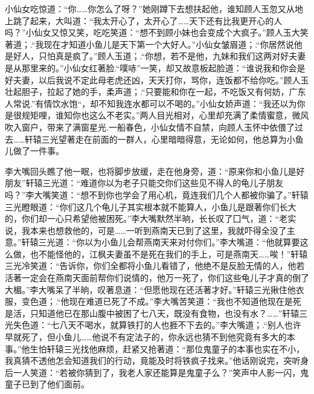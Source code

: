 \documentclass[12pt,oneside]{book}
\begin{document}
小仙女吃惊道：``你\ldots\ldots 你怎么了呀？''她刚蹲下去想扶起他，谁知顾人玉忽又从地上跳了起来，大叫道：``我太开心了，太开心了\ldots\ldots 天下还有比我更开心的人吗？''小仙女又惊又笑，吃吃笑道：``想不到顾小妹也会变成个大疯子。''顾人玉大笑著道；.``我现在才知道小鱼儿是天下第一个大好人。''小仙女皱眉道；.``你居然说他是好人，只怕真是疯了。''顾人玉道；.``你想，若不是他，九妹和我们这两对好夫妻是从那里来的。''小仙女红著脸.``噗哧''一笑，却又故意板起脸道：``谁说我和你会是好夫妻，以后我说不定此母老虎还凶，天天打你，骂你，连饭都不给你吃。''顾人玉壮起胆子，拉起了她的手，柔声道；.``只要能和你在一起，不吃饭又有何妨，广东人常说.''有情饮水饱``，却不知我连水都可以不喝的。''小仙女娇声道：``我还以为你是很规矩哩，谁知你也这么不老实。''两人目光相对，心里却充满了柔情蜜意，微风吹入窗户，带来了满窗星光.一船春色，小仙女情不自禁，向顾人玉怀中依偎了过去\ldots\ldots 轩辕三光望著走在前面的一群人，心里暗暗得意，无论如何，他总算为小鱼儿做了一件事。

李大嘴回头瞧了他一眠，也将脚步放缓，走在他身旁，道：``原来你和小鱼儿是好朋友''轩辕三光道：``难道你以为老子只能交你们这些见不得人的龟儿子朋友吗？''李大嘴笑道：``想不到你也学会了用心机，竟连我们几个人都被你骗了。''轩辕三光瞪眼道：``你们这几个龟儿子其实根本就不能算人，小鱼儿是跟著你们长大的，你们却一心只希望他被困死。''李大嘴默然半晌，长长叹了囗气，道：``老实说，我本来也想救他的，可是\ldots\ldots 一听到燕南天已到了这里，我就吓得全没了主意。''轩辕三光道：``你以为小鱼儿会帮燕南天来对付你们。''李大嘴道：``他就算要这么做，也不能怪他的，江枫夫妻虽不是死在我们的手上，可是燕南天\ldots\ldots 唉！''轩辕三光冷笑道：``告诉你，你们全都将小鱼儿看错了，他绝不是反脸无情的人，他若活著一定会在燕南天面前帮你们说情的，他万一死了，你们这些龟儿子才真的倒了大楣。''李大嘴呆了半晌，叹著息道：``但愿他现在还活著才好。''轩辕三光揪住他衣服，变色道；.``他现在难道已死了不成。''李大嘴苦笑道：``我也不知道他现在是死是活，只知道他已在那山腹中被困了七八天，既没有食物，也没有水？\ldots\ldots{}''轩辕三光失色道：``七八天不喝水，就算铁打的人也捱不下去的。''李大嘴道；.``别人也许早就死了，但小鱼儿\ldots\ldots 他说不有定法子的，你永远也猜不到他究竟有多大的本事。''他生怕轩辕三光找他麻烦，赶紧又抢著道：``那位鬼童子的本事也实在不小，我真猜不透他怎会知道我们的行动，竟能及时将铁疯子找来。''他话刚说完，突听身后一人笑道：``若被你猜到了，我老人家还能算是鬼童子么？''笑声中人影一闪，鬼童子已到了他们面前。
\end{document}
